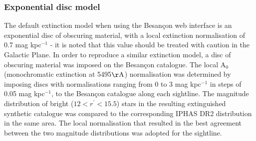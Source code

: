 \documentclass[a4paper,useAMS,usenatbib]{mn2e}
\begin{document}
\subsubsection{Exponential disc model}
The default extinction model when using the Besan\c{c}on web interface is an exponential disc of obscuring material, with a local extinction normalisation of 0.7 mag kpc$^{-1}$ - it is noted that this value should be treated with caution in the Galactic Plane. In order to reproduce a similar extinction model, a disc of obscuring material was imposed on the Besan\c{c}on catalogue. The local A$_0$ (monochromatic extinction at 5495$\mathrm{\AA}$) normalisation was determined by imposing discs with normalisations ranging from 0 to 3 mag kpc$^{-1}$ in steps of 0.05 mag kpc$^{-1}$, to the Besan\c{c}on catalogue along each sightline. The magnitude distribution of bright ($12<r^{\prime}<15.5$) stars in the resulting extinguished synthetic catalogue was compared to the corresponding IPHAS DR2 distribution in the same area. The local normalisation that resulted in the best agreement between the two magnitude distributions was adopted for the sightline.
\end{document}
